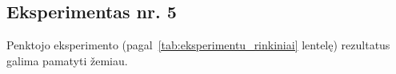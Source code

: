 \subsection{Eksperimentas nr. 5}
\label{subsec:eksperimentas_nr_5}

Penktojo eksperimento (pagal~\ref{tab:eksperimentu_rinkiniai} lentelę) rezultatus galima pamatyti žemiau.

